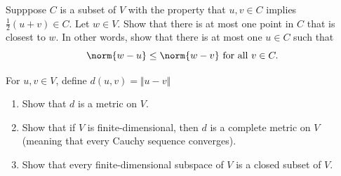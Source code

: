 \documentclass[12pt,letterpaper]{hmcpset}
\begin{document}
\begin{problem}[28]
Supppose $C$ is a subset of $V$ with the property that $u, v \in C$ implies $\frac{1}{2} (u + v) \in C$. Let $w \in V$. Show that there is at most one point in $C$ that is closest to $w$. In other words, show that there is at most one $u \in C$ such that
	\[
		\norm{w - u} \le \norm{w - v} \text{ for all } v \in C.
	\]
\end{problem}

\begin{problem}[29]
    For \( u , v \in V \), define \( d(u, v) = \Vert u - v \Vert \)
    \begin{enumerate}
        \item Show that $d$ is a metric on $V$.
        \item Show that if $V$ is finite-dimensional, then $d$ is a complete metric on $V$ (meaning that every Cauchy sequence converges).
        \item Show that every finite-dimensional subspace of $V$ is a closed subset of $V$.
    \end{enumerate}
\end{problem}
\end{document}
